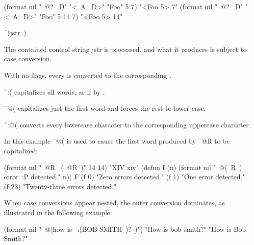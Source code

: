 \code
 (format nil "~@? ~D" "<~A ~D>" "Foo" 5 7) \EV "<Foo 5> 7"
 (format nil "~@? ~D" "<~A ~D>" "Foo" 5 14 7) \EV "<Foo 5> 14"
\endcode

\endsubsubsection%

\endsubsection%



\f{~(\j{str}~)}

The contained control string \j{str} is processed, and what it produces
is subject to case conversion.

With no flags, every  
is converted to the corresponding  .

\f{~:(} capitalizes all words, as if by .
                        
\f{~@(} 
capitalizes just the first word and forces the rest to lower
case.

\f{~:@(} converts every lowercase character
to the corresponding uppercase character.

In this example \f{~@(} is used to cause the first word
produced by \f{~@R} to be capitalized:

\code
 (format nil "~@R ~(~@R~)" 14 14) 
\EV "XIV xiv"
 (defun f (n) (format nil "~@(~R~) error~:P detected." n)) \EV F
 (f 0) \EV "Zero errors detected."
 (f 1) \EV "One error detected."
 (f 23) \EV "Twenty-three errors detected."
\endcode

When case conversions appear nested, the outer conversion dominates,
as illustrated in the following example:

\code
 (format nil "~@(how is ~:(BOB SMITH~)?~)")
 \EV "How is bob smith?"
 \NV "How is Bob Smith?"
\endcode

\endsubsubsection%



